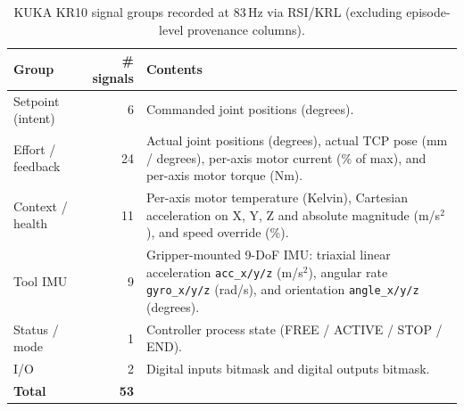 \begin{table}[htbp]
    \centering
    \caption{KUKA KR10 signal groups recorded at 83\,Hz via RSI/KRL (excluding episode-level provenance columns).}
    \label{tab:kuka_signals}
    \small
    \begin{tabular}{@{}lrp{7.5cm}@{}}
        \toprule
        Group             & \# signals  & Contents                                                                                                                                                                           \\
        \midrule
        Setpoint (intent) & 6           & Commanded joint positions (degrees).                                                                                                                                               \\
        Effort / feedback & 24          & Actual joint positions (degrees), actual TCP pose (mm / degrees), per-axis motor current (\% of max), and per-axis motor torque (Nm).                                              \\
        Context / health  & 11          & Per-axis motor temperature (Kelvin), Cartesian acceleration on X, Y, Z and absolute magnitude (m/s$^2$), and speed override (\%).                                                  \\
        Tool IMU          & 9           & Gripper-mounted 9-DoF IMU: triaxial linear acceleration \texttt{acc\_x/y/z} (m/s$^2$), angular rate \texttt{gyro\_x/y/z} (rad/s), and orientation \texttt{angle\_x/y/z} (degrees). \\
        Status / mode     & 1           & Controller process state (FREE / ACTIVE / STOP / END).                                                                                                                             \\
        I/O               & 2           & Digital inputs bitmask and digital outputs bitmask.                                                                                                                                \\
        \midrule
        \textbf{Total}    & \textbf{53} &                                                                                                                                                                                    \\
        \bottomrule
    \end{tabular}
\end{table}



